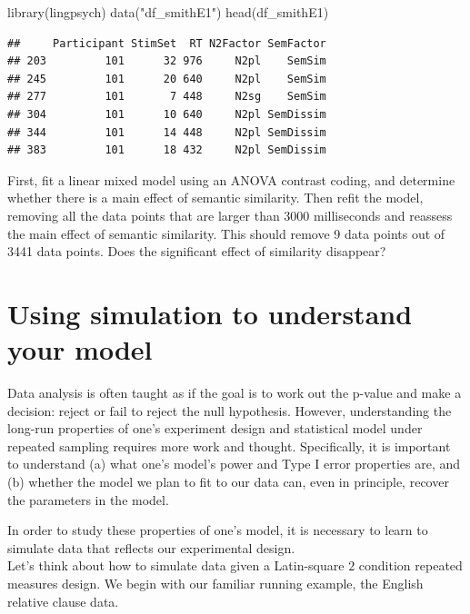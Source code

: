 \documentclass[
  12pt,
]{krantz}
\newenvironment{Shaded}{\begin{snugshade}}{\end{snugshade}}
\newcommand{\FunctionTok}[1]{\textcolor[rgb]{0.00,0.00,0.00}{#1}}
\newcommand{\NormalTok}[1]{#1}
\newcommand{\StringTok}[1]{\textcolor[rgb]{0.31,0.60,0.02}{#1}}
\theoremstyle{definition}
\theoremstyle{definition}
\theoremstyle{definition}
\theoremstyle{definition}
\theoremstyle{remark}
\begin{document}
\begin{Shaded}
\begin{Highlighting}[]
\FunctionTok{library}\NormalTok{(lingpsych)}
\FunctionTok{data}\NormalTok{(}\StringTok{"df\_smithE1"}\NormalTok{)}
\FunctionTok{head}\NormalTok{(df\_smithE1)}
\end{Highlighting}
\end{Shaded}

\begin{verbatim}
##     Participant StimSet  RT N2Factor SemFactor
## 203         101      32 976     N2pl    SemSim
## 245         101      20 640     N2pl    SemSim
## 277         101       7 448     N2sg    SemSim
## 304         101      10 640     N2pl SemDissim
## 344         101      14 448     N2pl SemDissim
## 383         101      18 432     N2pl SemDissim
\end{verbatim}

First, fit a linear mixed model using an ANOVA contrast coding, and determine whether there is a main effect of semantic similarity. Then refit the model, removing all the data points that are larger than 3000 milliseconds and reassess the main effect of semantic similarity. This should remove 9 data points out of 3441 data points. Does the significant effect of similarity disappear?

\hypertarget{using-simulation-to-understand-your-model}{%
\chapter{Using simulation to understand your model}\label{using-simulation-to-understand-your-model}}

Data analysis is often taught as if the goal is to work out the p-value and make a decision: reject or fail to reject the null hypothesis. However, understanding the long-run properties of one's experiment design and statistical model under repeated sampling requires more work and thought. Specifically, it is important to understand (a) what one's model's power and Type I error properties are, and (b) whether the model we plan to fit to our data can, even in principle, recover the parameters in the model.

In order to study these properties of one's model, it is necessary to learn to simulate data that reflects our experimental design.\\
Let's think about how to simulate data given a Latin-square \(2\) condition repeated measures design. We begin with our familiar running example, the \citet{grodner} English relative clause data.
\end{document}

